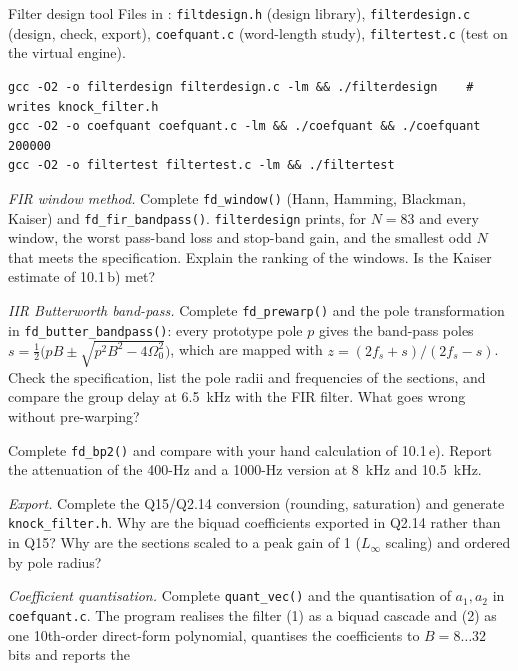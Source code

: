 \begin{exercise}{Filter design tool}{\JSLinux}
\sloppy
Files in : \texttt{filtdesign.h} (design library),
\texttt{filterdesign.c} (design, check, export), \texttt{coefquant.c}
(word-length study), \texttt{filtertest.c} (test on the virtual engine).
\begin{lstlisting}[style=shell]
gcc -O2 -o filterdesign filterdesign.c -lm && ./filterdesign    # writes knock_filter.h
gcc -O2 -o coefquant coefquant.c -lm && ./coefquant && ./coefquant 200000
gcc -O2 -o filtertest filtertest.c -lm && ./filtertest
\end{lstlisting}
\begin{tasks}
  \item \emph{FIR window method.} Complete \texttt{fd\_window()} (Hann, Hamming,
    Blackman, Kaiser) and \texttt{fd\_fir\_bandpass()}. \texttt{filterdesign}
    prints, for $N=83$ and every window, the worst pass-band loss and stop-band
    gain, and the smallest odd $N$ that meets the specification. Explain the
    ranking of the windows. Is the Kaiser estimate of 10.1\,b) met?
  \item \emph{IIR Butterworth band-pass.} Complete \texttt{fd\_prewarp()} and the
    pole transformation in \texttt{fd\_butter\_bandpass()}: every prototype pole
    $p$ gives the band-pass poles $s=\tfrac12\bigl(pB\pm\sqrt{p^2B^2-4\Omega_0^2}\bigr)$,
    which are mapped with $z=(2f_s+s)/(2f_s-s)$. Check the specification, list the
    pole radii and frequencies of the sections, and compare the group delay at
    \SI{6.5}{kHz} with the FIR filter. What goes wrong without pre-warping?
  \item Complete \texttt{fd\_bp2()} and compare with your hand calculation of
    10.1\,e). Report the attenuation of the 400-Hz and a 1000-Hz version at
    \SI{8}{kHz} and \SI{10.5}{kHz}.
  \item \emph{Export.} Complete the Q15/Q2.14 conversion (rounding, saturation)
    and generate \texttt{knock\_filter.h}. Why are the biquad coefficients
    exported in Q2.14 rather than in Q15? Why are the sections scaled to a
    peak gain of 1 ($L_\infty$ scaling) and ordered by pole radius?
  \item \emph{Coefficient quantisation.} Complete \texttt{quant\_vec()} and the
    quantisation of $a_1,a_2$ in \texttt{coefquant.c}. The program realises the
    filter (1) as a biquad cascade and (2) as one 10th-order direct-form
    polynomial, quantises the coefficients to $B=8\dots32$ bits and reports the

\end{tasks}
\end{exercise}
